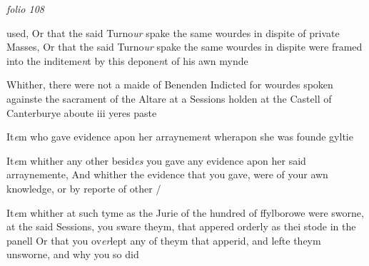 \documentclass[12pt, a4paper]{book}
\begin{document}
\dotfill
					

\textit{folio 108}


 	
 		
		\ifthenelse{\isodd{\thepage}}
		{\reversemarginpar}
		{\normalmarginpar}
		
 			used, Or that the said Turno\textit{ur} spake the same wourdes
 			in dispite of private Masses, Or that the said Turno\textit{ur}
 spake the same wourdes in dispite were framed into the
 inditeme\textit{n}t by this depone\textit{n}t of his awn mynde
 




				\marginpar[\vspace{0.5cm}{\textcolor{Gray}{9}}]{}
			
		\ifthenelse{\isodd{\thepage}}
		{\reversemarginpar}
		{\normalmarginpar}
		 Whither, there were not a maide of Benenden Indicted
 for wourdes spoken againste the sacrament of the Altare
 at a Sessions holden at the Castell of Canterburye
 aboute iii yeres paste
 




				\marginpar[\vspace{0.5cm}{\textcolor{Gray}{10}}]{}
			
		\ifthenelse{\isodd{\thepage}}
		{\reversemarginpar}
		{\normalmarginpar}
		 It\textit{e}m who gave evidence apon her arrayneme\textit{n}t wherapon
 she was founde gyltie
 




				\marginpar[\vspace{0.5cm}{\textcolor{Gray}{11}}]{}
			
		\ifthenelse{\isodd{\thepage}}
		{\reversemarginpar}
		{\normalmarginpar}
		 It\textit{e}m whither any other besid\textit{es} you gave any evidence apon
 her said arraynemente, And whither the evidence that
 you gave, were of your awn knowledge, or by reporte
 of other /
 




				\marginpar[\vspace{0.5cm}{\textcolor{Gray}{12}}]{}
			
		\ifthenelse{\isodd{\thepage}}
		{\reversemarginpar}
		{\normalmarginpar}
		 It\textit{e}m whither at such tyme as the Jurie of the hundred of
 ffylborowe were sworne, at the said Sessions, you sware
 theym, that appered orderly as thei stode in the panell
 Or that you ov\textit{er}lept any of theym that apperid, and lefte
 theym unsworne, and why you so did
 
\end{document}
